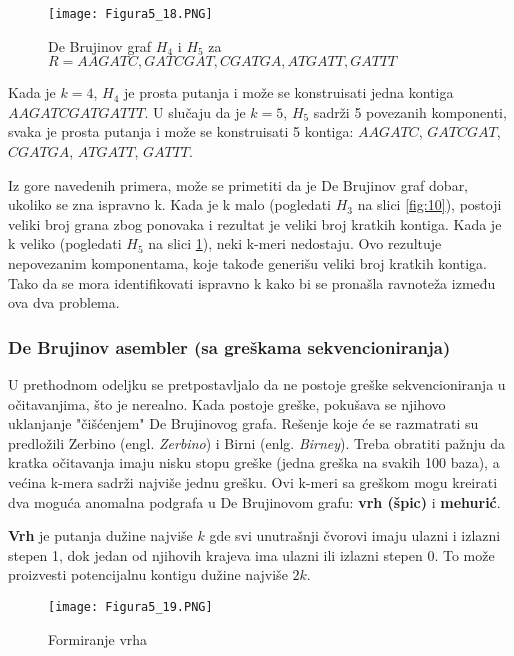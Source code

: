 \documentclass[12pt,oneside]{memoir}
\begin{document}
\begin{figure}[!ht]
\centering
\texttt{[image: Figura5\_18.PNG]}
\caption{De Brujinov graf $H_4$ i $H_5$ za $R = {AAGATC, GATCGAT, CGATGA, ATGATT, GATTT}$}
\label{fig:12}
\end{figure}

Kada je $k = 4$, $H_4$ je prosta putanja i može se konstruisati jedna kontiga $AAGATCGATGATTT$. U slučaju da je $k = 5$, $H_5$ sadrži 5 povezanih komponenti, svaka je prosta putanja i može se konstruisati 5 kontiga: $AAGATC$, $GATCGAT$, $CGATGA$, $ATGATT$, $GATTT$.

Iz gore navedenih primera, može se primetiti da je De Brujinov graf dobar, ukoliko se zna ispravno k. Kada je k malo (pogledati $H_3$ na slici \ref{fig:10}), postoji veliki broj grana zbog ponovaka i rezultat je veliki broj kratkih kontiga. Kada je k veliko (pogledati $H_5$ na slici \ref{fig:12}), neki k-meri nedostaju. Ovo rezultuje nepovezanim komponentama, koje takođe generišu veliki broj kratkih kontiga. Tako da se mora identifikovati ispravno k kako bi se pronašla ravnoteža između ova dva problema.

\subsubsection{De Brujinov asembler (sa greškama sekvencioniranja)}

U prethodnom odeljku se pretpostavljalo da ne postoje greške sekvencioniranja u očitavanjima, što je nerealno. Kada postoje greške, pokušava se njihovo uklanjanje "čišćenjem" De Brujinovog grafa. Rešenje koje će se razmatrati su predložili Zerbino (engl. \textit{Zerbino}) i Birni (enlg. \textit{Birney}). Treba obratiti pažnju da kratka očitavanja imaju nisku stopu greške (jedna greška na svakih 100 baza), a većina k-mera sadrži najviše jednu grešku. Ovi k-meri sa greškom mogu kreirati dva moguća anomalna podgrafa u De Brujinovom grafu: \textbf{vrh (špic)} i \textbf{mehurić}.

\textbf{Vrh} je putanja dužine najviše $k$ gde svi unutrašnji čvorovi imaju ulazni i izlazni stepen 1, dok jedan od njihovih krajeva ima ulazni ili izlazni stepen 0. To može proizvesti potencijalnu kontigu dužine najviše $2k$.

\begin{figure}[!ht]
\centering
\texttt{[image: Figura5\_19.PNG]}
\caption{Formiranje vrha}
\label{fig:13}
\end{figure}
\end{document}
